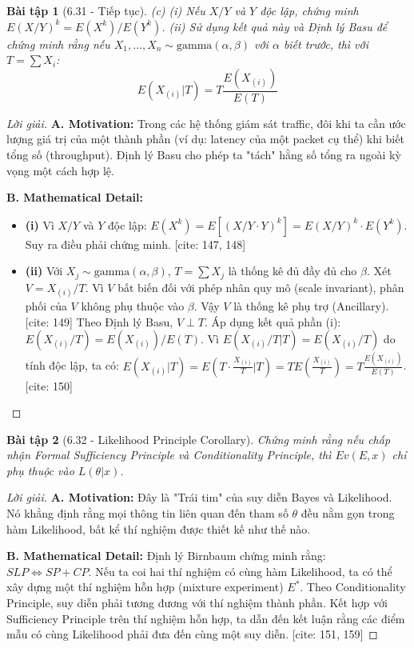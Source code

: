 \documentclass[8pt,a4paper]{article}
\newtheorem{exercise}{Bài tập}
\newenvironment{solution}{\begin{proof}[Lời giải]}{\end{proof}}
\begin{document}

\begin{exercise}[6.31 - Tiếp tục]
(c) (i) Nếu $X/Y$ và $Y$ độc lập, chứng minh $E(X/Y)^k = E(X^k)/E(Y^k)$. 
(ii) Sử dụng kết quả này và Định lý Basu để chứng minh rằng nếu $X_1, \dots, X_n \sim \text{gamma}(\alpha, \beta)$ với $\alpha$ biết trước, thì với $T = \sum X_i$:
\[ E(X_{(i)} | T) = T \frac{E(X_{(i)})}{E(T)} \]
\end{exercise}

\begin{solution}
\textbf{A. Motivation:} Trong các hệ thống giám sát traffic, đôi khi ta cần ước lượng giá trị của một thành phần (ví dụ: latency của một packet cụ thể) khi biết tổng số (throughput). Định lý Basu cho phép ta "tách" hằng số tổng ra ngoài kỳ vọng một cách hợp lệ.

\textbf{B. Mathematical Detail:}
\begin{itemize}
    \item \textbf{(i)} Vì $X/Y$ và $Y$ độc lập: $E(X^k) = E[(X/Y \cdot Y)^k] = E(X/Y)^k \cdot E(Y^k)$. Suy ra điều phải chứng minh. [cite: 147, 148]
    \item \textbf{(ii)} Với $X_j \sim \text{gamma}(\alpha, \beta)$, $T = \sum X_j$ là thống kê đủ đầy đủ cho $\beta$. 
    Xét $V = X_{(i)}/T$. Vì $V$ bất biến đối với phép nhân quy mô (scale invariant), phân phối của $V$ không phụ thuộc vào $\beta$. Vậy $V$ là thống kê phụ trợ (Ancillary). [cite: 149]
    Theo Định lý Basu, $V \perp T$. Áp dụng kết quả phần (i):
    $E(X_{(i)}/T) = E(X_{(i)})/E(T)$. 
    Vì $E(X_{(i)}/T | T) = E(X_{(i)}/T)$ do tính độc lập, ta có:
    $E(X_{(i)} | T) = E(T \cdot \frac{X_{(i)}}{T} | T) = T E(\frac{X_{(i)}}{T}) = T \frac{E(X_{(i)})}{E(T)}$. [cite: 150]
\end{itemize}
\end{solution}

\begin{exercise}[6.32 - Likelihood Principle Corollary]
Chứng minh rằng nếu chấp nhận Formal Sufficiency Principle và Conditionality Principle, thì $Ev(E, x)$ chỉ phụ thuộc vào $L(\theta|x)$.
\end{exercise}

\begin{solution}
\textbf{A. Motivation:} Đây là "Trái tim" của suy diễn Bayes và Likelihood. Nó khẳng định rằng mọi thông tin liên quan đến tham số $\theta$ đều nằm gọn trong hàm Likelihood, bất kể thí nghiệm được thiết kế như thế nào.

\textbf{B. Mathematical Detail:}
Định lý Birnbaum chứng minh rằng: $SLP \iff SP + CP$. 
Nếu ta coi hai thí nghiệm có cùng hàm Likelihood, ta có thể xây dựng một thí nghiệm hỗn hợp (mixture experiment) $E^*$. Theo Conditionality Principle, suy diễn phải tương đương với thí nghiệm thành phần. Kết hợp với Sufficiency Principle trên thí nghiệm hỗn hợp, ta dẫn đến kết luận rằng các điểm mẫu có cùng Likelihood phải đưa đến cùng một suy diễn. [cite: 151, 159]
\end{solution}
\end{document}
